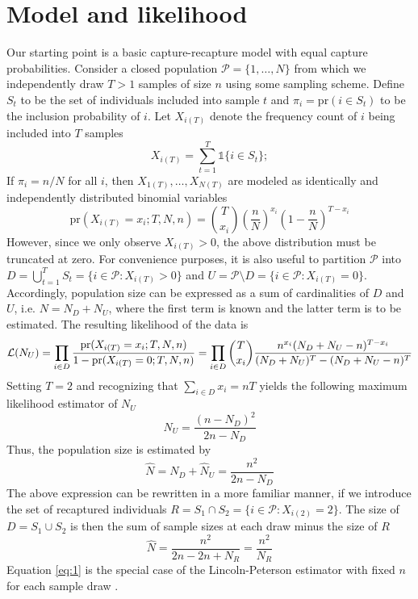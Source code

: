 \documentclass[manuscript]{biometrika}
\begin{document}
\section{Model and likelihood}
Our starting point is a basic capture-recapture model with equal capture probabilities. Consider a closed population $\mathcal{P} = \{1,\ldots,N\}$ from which we independently draw $T > 1$ samples of size $n$ using some sampling scheme. Define $S_t$ to be the set of individuals included into sample $t$ and $\pi_i = \text{pr}(i \in S_t)$ to be the inclusion probability of $i$. Let $X_{i(T)}$ denote the frequency count of $i$ being included into $T$ samples
\begin{equation*}
X_{i(T)} = \sum_{t=1}^T \mathds{1}\{i \in S_t\};
\end{equation*}
If $\pi_i = n / N$ for all $i$, then $X_{1(T)}, \ldots, X_{N(T)}$ are modeled as identically and independently distributed binomial variables
\begin{equation*}
\text{pr}(X_{i(T)} = x_i; T, N, n) = \binom{T}{x_i} \left(\frac{n}{N}\right)^{x_i} \left(1 - \frac{n}{N}\right)^{T - x_i}
\end{equation*}
However, since we only observe $X_{i(T)} > 0$, the above distribution must be truncated at zero. For convenience purposes, it is also useful to partition $\mathcal{P}$ into $D = \bigcup_{t=1}^T S_t = \{i \in \mathcal{P}: X_{i(T)} > 0\}$ and $U = \mathcal{P} \setminus D = \{i \in \mathcal{P}: X_{i(T)} = 0\}$. Accordingly, population size can be expressed as a sum of cardinalities of $D$ and $U$, i.e. $N = N_D + N_U$, where the first term is known and the latter term is to be estimated.  The resulting likelihood of the data is
\begin{equation*}
\mathcal{L}(N_U) = \prod_{i \in D} \frac{\text{pr}(X_{i(T)} = x_i; T, N, n)}{1 - \text{pr}(X_{i(T)} = 0; T, N, n)} = \prod_{i \in D} \binom{T}{x_i} \frac{n^{x_i} (N_D + N_U - n)^{T-x_i}}{(N_D + N_U)^{T} - (N_D + N_U - n)^T} \\
\end{equation*}
Setting $T = 2$ and recognizing that $\sum_{i \in D} x_i = nT$ yields the following maximum likelihood estimator of $N_U$
\begin{equation} \label{eq:0}
\widehat{N}_U = \frac{(n - N_D)^2}{2n - N_D}
\end{equation}
Thus, the population size is estimated by
\begin{equation*}
\widehat{N} = N_D + \widehat{N}_U = \frac{n^2}{2n - N_D}
\end{equation*}
The above expression can be rewritten in a more familiar manner, if we introduce the set of recaptured individuals $R = S_1 \cap S_2 = \{i \in \mathcal{P}: X_{i(2)} = 2\}$. The size of $D = S_1 \cup S_2$ is then the sum of sample sizes at each draw minus the size of $R$
\begin{equation} \label{eq:1}
\widehat{N} = \frac{n^2}{2n - 2n + N_R} = \frac{n^2}{N_R}
\end{equation}
Equation \eqref{eq:1} is the special case of the Lincoln-Peterson estimator with fixed $n$ for each sample draw \citep{Pollock:1990}.
\end{document}
